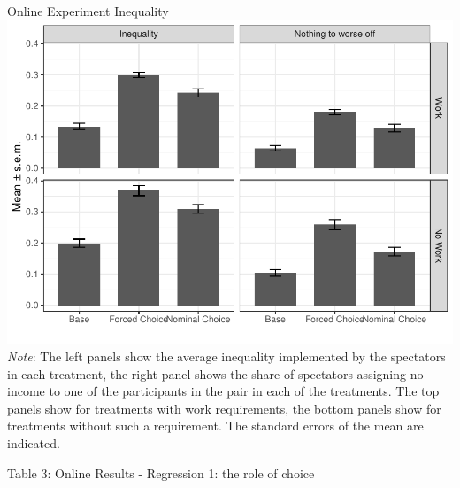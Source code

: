 \documentclass{beamer}
\begin{document}
\begin{frame}{Online Experiment Inequality}
	\includegraphics[height=.9\textheight]{../graphs/mean_ineq_nothing_kantar_wd.pdf}
	\emph{Note}: The left panels show the average inequality implemented by the spectators in
each treatment, the right panel shows the share of spectators assigning no income to
one of the participants in the pair in each of the treatments. The top panels show for
treatments with work requirements, the bottom panels show for treatments without
such a requirement. The standard errors of the mean are indicated.
\end{frame}
\begin{frame}{Table 3: Online Results -  Regression 1: the role of choice}{\tiny
		
	}  %
\end{frame}
\end{document}
